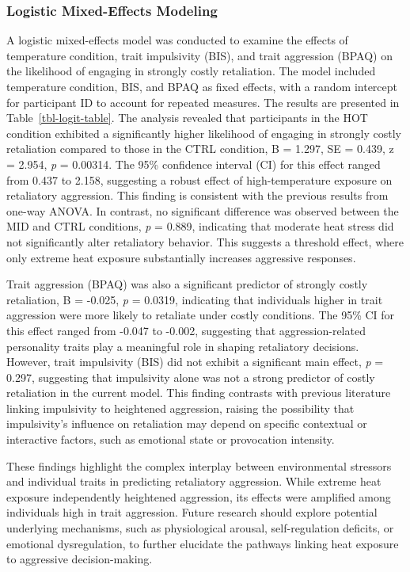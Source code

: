 \documentclass[
  man,
  floatsintext,
  longtable,
  nolmodern,
  notxfonts,
  notimes,
  colorlinks=true,linkcolor=blue,citecolor=blue,urlcolor=blue]{apa7}
\begin{document}
\subsubsection{Logistic Mixed-Effects
Modeling}\label{logistic-mixed-effects-modeling}

A logistic mixed-effects model was conducted to examine the effects of
temperature condition, trait impulsivity (BIS), and trait aggression
(BPAQ) on the likelihood of engaging in strongly costly retaliation. The
model included temperature condition, BIS, and BPAQ as fixed effects,
with a random intercept for participant ID to account for repeated
measures. The results are presented in Table~\ref{tbl-logit-table}. The
analysis revealed that participants in the HOT condition exhibited a
significantly higher likelihood of engaging in strongly costly
retaliation compared to those in the CTRL condition, B = 1.297, SE =
0.439, z = 2.954, \emph{p} = 0.00314. The 95\% confidence interval (CI)
for this effect ranged from 0.437 to 2.158, suggesting a robust effect
of high-temperature exposure on retaliatory aggression. This finding is
consistent with the previous results from one-way ANOVA. In contrast, no
significant difference was observed between the MID and CTRL conditions,
\emph{p} = 0.889, indicating that moderate heat stress did not
significantly alter retaliatory behavior. This suggests a threshold
effect, where only extreme heat exposure substantially increases
aggressive responses.

Trait aggression (BPAQ) was also a significant predictor of strongly
costly retaliation, B = -0.025, \emph{p} = 0.0319, indicating that
individuals higher in trait aggression were more likely to retaliate
under costly conditions. The 95\% CI for this effect ranged from -0.047
to -0.002, suggesting that aggression-related personality traits play a
meaningful role in shaping retaliatory decisions. However, trait
impulsivity (BIS) did not exhibit a significant main effect, \emph{p} =
0.297, suggesting that impulsivity alone was not a strong predictor of
costly retaliation in the current model. This finding contrasts with
previous literature linking impulsivity to heightened aggression,
raising the possibility that impulsivity's influence on retaliation may
depend on specific contextual or interactive factors, such as emotional
state or provocation intensity.

These findings highlight the complex interplay between environmental
stressors and individual traits in predicting retaliatory aggression.
While extreme heat exposure independently heightened aggression, its
effects were amplified among individuals high in trait aggression.
Future research should explore potential underlying mechanisms, such as
physiological arousal, self-regulation deficits, or emotional
dysregulation, to further elucidate the pathways linking heat exposure
to aggressive decision-making.
\end{document}
